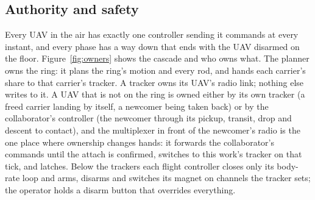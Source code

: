 
\subsection{Authority and safety}
\label{sec:safety}

Every UAV in the air has exactly one controller sending it commands at every instant, and every phase has a way
down that ends with the UAV disarmed on the floor. Figure~\ref{fig:owners} shows the cascade and who owns what.
The planner owns the ring: it plans the ring's motion and every rod, and hands each carrier's share to that
carrier's tracker. A tracker owns its UAV's radio link; nothing else writes to it. A UAV that is not on the ring
is owned either by its own tracker (a freed carrier landing by itself, a newcomer being taken back) or by the
collaborator's controller (the newcomer through its pickup, transit, drop and descent to contact), and the
multiplexer in front of the newcomer's radio is the one place where ownership changes hands: it forwards the
collaborator's commands until the attach is confirmed, switches to this work's tracker on that tick, and latches.
Below the trackers each flight controller closes only its body-rate loop and arms, disarms and switches its magnet
on channels the tracker sets; the operator holds a disarm button that overrides everything.

